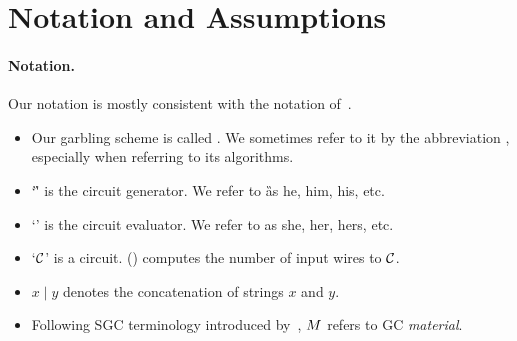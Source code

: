 \section{Notation and Assumptions}\label{sec:notation}

\paragraph{Notation.}

Our notation is mostly consistent with the notation of~\HK.

\begin{itemize}
  \item Our garbling scheme is called \ourschemelong. We sometimes
    refer to it by the abbreviation \ourscheme, especially when
    referring to its algorithms.
	\item `\G' is the circuit generator. We refer to \G as
	he, him, his, etc.
	\item `\E' is the circuit evaluator. We refer to \E as
	she, her, hers, etc.
  \item `$\mathcal C$' is a circuit. \inpsize(\cir) computes the number of
    input wires to $\mathcal C$.
  \item $x \mid y$ denotes the concatenation of strings $x$ and
    $y$.
	\item Following SGC terminology introduced by~\cite{AC:Kolesnikov18}, $M$ refers to GC \emph{material}.

\end{itemize}
